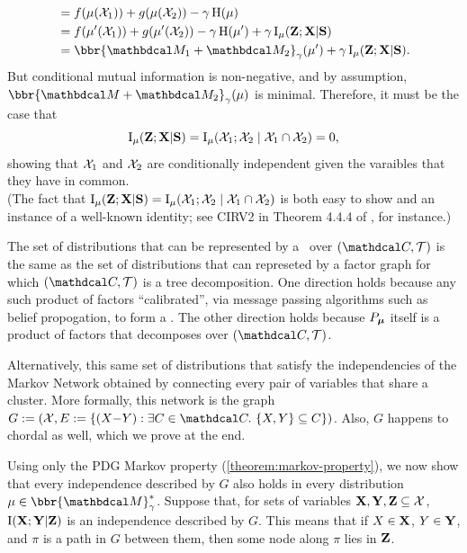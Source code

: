 \begin{subappendices}
\begin{lproof}
\begin{align*}
         &= f(\mu(\X_1)) + g(\mu(\X_2)) - \gamma \H(\mu) \\
         &= f(\mu'(\X_1)) + g(\mu'(\X_2)) - \gamma \H(\mu') + \gamma \I_\mu(\mat Z; \mat X| \mat S) \\
         &= \bbr{\dg M_1 \bundle \dg M_2}_\gamma(\mu') + \gamma \I_\mu(\mat Z; \mat X| \mat S).
    \end{align*}
    But conditional mutual information is non-negative, and by assumption, $\bbr{\dg M \bundle \dg M_2}_\gamma(\mu)$ is minimal. Therefore, it must be the case that
    \[
        \operatorname{\mathrm{I}}_\mu(\mathbf Z; \mathbf X| \mathbf S) = \operatorname{\mathrm{I}}_\mu(\mathcal X_1; \mathcal X_2 \mid \mathcal X_1 \cap \mathcal X_2) = 0,
    \]
    showing that $\mathcal X_1$ and $\mathcal X_2$ are conditionally independent given the varaibles that they have in common. \\
    (The fact that $\operatorname{\mathrm{I}}_\mu(\mathbf Z; \mathbf X| \mathbf S) = \operatorname{\mathrm{I}}_\mu(\mathcal X_1; \mathcal X_2 \mid \mathcal X_1 \cap \mathcal X_2)$ is both easy to show and an instance of a well-known identity; see CIRV2 in Theorem 4.4.4 of \textcite{halpern2017reasoning}, for instance.)
\end{lproof}

\begin{lproof}\label{proof:can-use-cliquetree}

    The set of distributions that can be represented by a \cactree\ over $(\C,\cal T)$ is the same as the set of distributions that can represeted by a factor graph for which $(\C, \cal T)$ is a tree decomposition.
    One direction holds because any such product of factors ``calibrated'', via message passing algorithms such as belief propogation, to form a \actree.
    The other direction holds because $P_{\boldsymbol\mu}$ itself is a product of factors that decomposes over $(\C, \cal T)$.



    Alternatively, this same set of distributions that satisfy the independencies of the Markov Network obtained by connecting every pair of variables that share a cluster.
    More formally, this network is the graph $G := (\X, E := \{ (X{-}Y) :  \exists C \in \C.~\{X,Y\} \subseteq C\})$.
    Also, $G$ happens to chordal as well, which we prove at the end.


    Using only the PDG Markov property (\cref{theorem:markov-property}), we now show that every independence described by $G$ also holds in every distribution $\mu \in \bbr{\dg M}^*_\gamma$.
    Suppose that,
    for sets of variables $\mathbf X, \mathbf Y, \mathbf Z \subseteq \mathcal X$,
    $\operatorname{\mathrm{I}}(\mathbf X; \mathbf Y|\mathbf Z)$ is an independence
    described by $G$.
    This means \parencite[Defn 4.8]{koller2009probabilistic} that
    if $X \in \mathbf X$, $Y \in \mathbf Y$, and $\pi$ is a path in $G$ between them, then
    some node along $\pi$ lies in $\mathbf Z$.



\end{lproof}
\end{subappendices}
